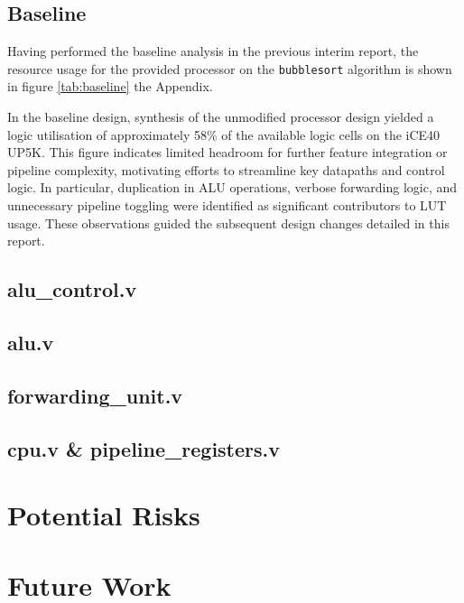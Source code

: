 \documentclass[a4paper,10pt]{article}
\begin{document}
\subsection{Baseline}
\label{sec:Baseline}

Having performed the baseline analysis in the previous interim report,
the resource usage for the provided processor on the \texttt{bubblesort}
algorithm is shown in figure \ref{tab:baseline} the Appendix.

In the baseline design, 
synthesis of the unmodified processor design yielded 
a logic utilisation of approximately 
58\% of the available logic cells on the iCE40 UP5K. 
This figure indicates limited headroom for further feature 
integration or pipeline complexity, 
motivating efforts to streamline key datapaths and control logic. 
In particular, duplication in ALU operations, verbose forwarding logic, 
and unnecessary pipeline toggling were identified 
as significant contributors to LUT usage. 
These observations guided the subsequent design changes detailed in this report.

\subsection{alu\_control.v}
\label{sec:alu_control.v}

\subsection{alu.v}
\label{sec:alu.v}

\subsection{forwarding\_unit.v}
\label{sec:forwarding_unit.v}

\subsection{cpu.v \& pipeline\_registers.v}
\label{sec:cpu.v_and_pipeline_registers.v}

\section{Potential Risks}
\label{sec:Potential_Risks}

\section{Future Work}
\label{sec:Future_Work}
\end{document}
